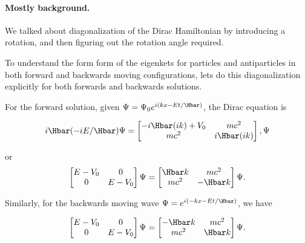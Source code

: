 

\paragraph{Mostly background.}

We talked about diagonalization of the Dirac Hamiltonian by introducing a rotation, and then figuring out the rotation angle required.

To understand the form form of the eigenkets for particles and antiparticles in both forward and backwards moving configurations, lets do this diagonalization explicitly for both forwards and backwards solutions.

For the forward solution, given \( \Psi = \Psi_0 e^{i(k x - E t/\Hbar) } \), the Dirac equation is

\begin{dmath}\label{eqn:gradQuantumProblemSet4Problem3:20}
i \Hbar (-i E/\Hbar) \Psi = 
\begin{bmatrix}
-i \Hbar (i k) + V_0 & m c^2 \\
m c^2 & i \Hbar (i k) 
\end{bmatrix},
\Psi
\end{dmath}

or
\begin{dmath}\label{eqn:gradQuantumProblemSet4Problem3:40}
\begin{bmatrix}
E - V_0 & 0 \\
0 & E - V_0
\end{bmatrix}
\Psi
=
\begin{bmatrix}
\Hbar k & m c^2 \\
m c^2 &  - \Hbar k
\end{bmatrix}
\Psi.
\end{dmath}

Similarly, for the backwards moving wave \( \Psi = e^{i(-k x - E t/\Hbar)} \), we have

\begin{dmath}\label{eqn:gradQuantumProblemSet4Problem3:60}
\begin{bmatrix}
E - V_0 & 0 \\
0 & E - V_0
\end{bmatrix}
\Psi
=
\begin{bmatrix}
-\Hbar k & m c^2 \\
m c^2 & \Hbar k
\end{bmatrix}
\Psi.
\end{dmath}


